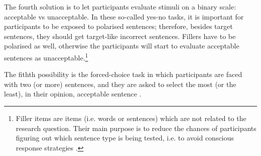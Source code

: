 The fourth solution is to let participants evaluate stimuli on a binary scale: acceptable vs unacceptable. In these so-called yes-no tasks, it is important for participants to be exposed to polarised sentences; therefore, besides target sentences, they should get target-like incorrect sentences. Fillers have to be polarised as well, otherwise the participants will start to evaluate acceptable sentences as unacceptable.\footnote{Filler items are items (i.e. words or sentences) which are not related to the research question. Their main purpose is to reduce the chances of participants figuring out which sentence type is being tested, i.e. to avoid conscious response strategies \citep[39]{SchutzeSprouse13}.}

\largerpage
The fithth possibility is the forced-choice task in which participants are faced with two (or more) sentences, and they are asked to select the most (or the least), in their opinion, acceptable sentence \citep[cf.][31]{SchutzeSprouse13}.

